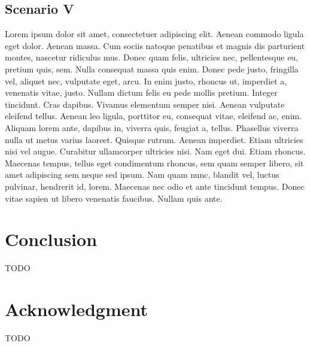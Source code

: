 \documentclass[conference]{IEEEtran}
\begin{document}
\subsection{Scenario V}
\label{scenario5}

Lorem ipsum dolor sit amet, consectetuer adipiscing elit. Aenean commodo ligula eget dolor. Aenean massa. Cum sociis natoque penatibus et magnis dis parturient montes, nascetur ridiculus mus. Donec quam felis, ultricies nec, pellentesque eu, pretium quis, sem. Nulla consequat massa quis enim. Donec pede justo, fringilla vel, aliquet nec, vulputate eget, arcu. In enim justo, rhoncus ut, imperdiet a, venenatis vitae, justo. Nullam dictum felis eu pede mollis pretium. Integer tincidunt. Cras dapibus. Vivamus elementum semper nisi. Aenean vulputate eleifend tellus. Aenean leo ligula, porttitor eu, consequat vitae, eleifend ac, enim. Aliquam lorem ante, dapibus in, viverra quis, feugiat a, tellus. Phasellus viverra nulla ut metus varius laoreet. Quisque rutrum. Aenean imperdiet. Etiam ultricies nisi vel augue. Curabitur ullamcorper ultricies nisi. Nam eget dui. Etiam rhoncus. Maecenas tempus, tellus eget condimentum rhoncus, sem quam semper libero, sit amet adipiscing sem neque sed ipsum. Nam quam nunc, blandit vel, luctus pulvinar, hendrerit id, lorem. Maecenas nec odio et ante tincidunt tempus. Donec vitae sapien ut libero venenatis faucibus. Nullam quis ante. 

\section{Conclusion}
TODO

\section*{Acknowledgment}
TODO



\end{document}
